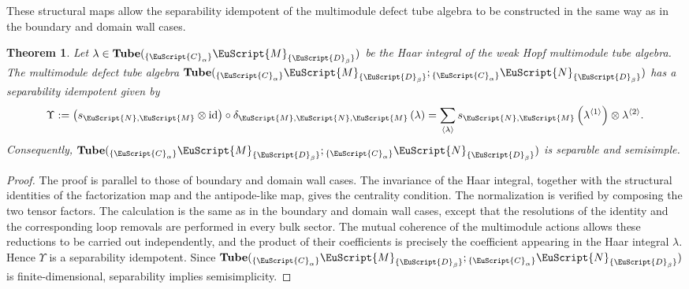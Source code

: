 \documentclass[a4paper,11pt]{article}
\newtheorem{theorem}{Theorem}[section]
\theoremstyle{definition}
\theoremstyle{remark}
\newcommand\eC           {\EuScript{C}}
\newcommand\eD           {\EuScript{D}}
\newcommand\eM          {\EuScript{M}}
\newcommand\eN         {\EuScript{N}}
\newcommand{\id}{\operatorname{id}}
\newcommand{\Tube}{\mathbf{Tube}}
\begin{document}
These structural maps allow the separability idempotent of the multimodule defect tube algebra to be constructed in the same way as in the boundary and domain wall cases.

\begin{theorem}
    \label{thm:sep-idem-multimodule}
    Let $\lambda \in \Tube({}_{\{\eC_\alpha\}}\eM_{\{\eD_\beta\}})$ be the Haar integral of the weak Hopf multimodule tube algebra. The multimodule defect tube algebra $\Tube({}_{\{\eC_\alpha\}}\eM_{\{\eD_\beta\}};{}_{\{\eC_\alpha\}}\eN_{\{\eD_\beta\}})$ has a separability idempotent given by
    \begin{equation}
        \label{eq:sep-idem-multimodule}
        \Upsilon :=\left(s_{\eN,\eM}\otimes\id\right)\circ \delta_{\eM,\eN,\eM} \left(\lambda\right)=\sum_{\langle\lambda\rangle}
        s_{\eN,\eM}\left(\lambda^{\langle 1\rangle}\right) \otimes \lambda^{\langle 2\rangle}.
    \end{equation}
    Consequently, $\Tube({}_{\{\eC_\alpha\}}\eM_{\{\eD_\beta\}};{}_{\{\eC_\alpha\}}\eN_{\{\eD_\beta\}})$ is separable and semisimple.
\end{theorem}

\begin{proof}
    The proof is parallel to those of boundary and domain wall cases. The invariance of the Haar integral, together with the structural identities of the factorization map and the antipode-like map, gives the centrality
    condition. The normalization is verified by composing the two tensor factors. The calculation is the same as in the boundary and
    domain wall cases, except that the resolutions of the identity and the corresponding loop removals are performed in every bulk sector. The mutual coherence of the multimodule actions allows these reductions to be carried out independently, and the product of their coefficients is precisely the coefficient appearing in the Haar integral $\lambda$. Hence $\Upsilon$ is a separability
    idempotent. Since $\Tube({}_{\{\eC_\alpha\}}\eM_{\{\eD_\beta\}};{}_{\{\eC_\alpha\}}\eN_{\{\eD_\beta\}})$ is finite-dimensional,
    separability implies semisimplicity.
\end{proof}
\end{document}
